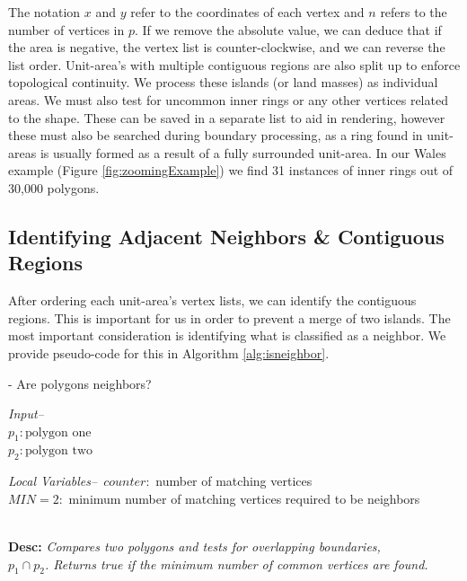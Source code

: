 The notation $x$ and $y$ refer to the coordinates of each vertex and $n$ refers to the number of vertices in $p$. If we remove the absolute value, we can deduce that if the area is negative, the vertex list is counter-clockwise, and we can reverse the list order. Unit-area's with multiple contiguous regions are also split up to enforce topological continuity. We process these islands (or land masses) as individual areas. We must also test for uncommon inner rings or any other vertices related to the shape. These can be saved in a separate list to aid in rendering, however these must also be searched during boundary processing, as a ring found in unit-areas is usually formed as a result of a fully surrounded unit-area. In our Wales example (Figure \ref{fig:zoomingExample}) we find 31 instances of inner rings out of 30,000 polygons.

\subsection{Identifying Adjacent Neighbors \& Contiguous Regions} \label{neighbors}
After ordering each unit-area's vertex lists, we can identify the contiguous regions. This is important for us in order to prevent a merge of two islands. The most important consideration is identifying what is classified as a neighbor. We provide pseudo-code for this in Algorithm \ref{alg:isneighbor}.

\begin{algorithm}[h]
\footnotesize
\caption{- Are polygons neighbors?}
\emph{Input--}\\
$p_{1}: \text{polygon one}$\\
$p_{2}: \text{polygon two}$\

\begin{algorithmic}[1]
\IfEnd
{}
\EndProcedure
\end{algorithmic}
\emph{Local Variables--}\
$counter:$ number of matching vertices\\
$MIN = 2:$ minimum number of matching vertices required to be neighbors 
\begin{algorithmic}[1]
\State{counter++}
\IfEnd
\IfEnd
{}

\EndProcedure
\end{algorithmic} \label{alg:isneighbor}
~\\
\textbf{Desc: }\emph{Compares two polygons and tests for overlapping boundaries,\\ $p_1 \cap p_2$. Returns true if the minimum number of common vertices are found. }
\end{algorithm}



